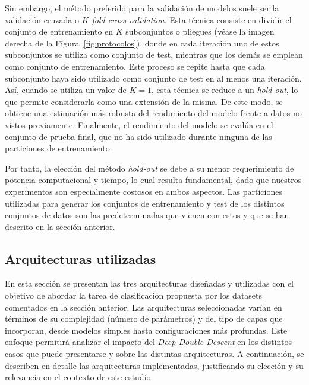 Sin embargo, el método preferido para la validación de modelos suele ser la validación cruzada o \textit{$K$-fold cross validation}. Esta técnica consiste en dividir el conjunto de entrenamiento en $K$ subconjuntos o pliegues (véase la imagen derecha de la Figura~\ref{fig:protocolos}), donde en cada iteración uno de estos subconjuntos se utiliza como conjunto de test, mientras que los demás se emplean como conjunto de entrenamiento. Este proceso se repite hasta que cada subconjunto haya sido utilizado como conjunto de test en al menos una iteración. Así, cuando se utiliza un valor de $K = 1$, esta técnica se reduce a un \textit{hold-out}, lo que permite considerarla como una extensión de la misma. De este modo, se obtiene una estimación más robusta del rendimiento del modelo frente a datos no vistos previamente. Finalmente, el rendimiento del modelo se evalúa en el conjunto de prueba final, que no ha sido utilizado durante ninguna de las particiones de entrenamiento.\newline

Por tanto, la elección del método \textit{hold-out} se debe a su menor requerimiento de potencia computacional y tiempo, lo cual resulta fundamental, dado que nuestros experimentos son especialmente costosos en ambos aspectos. Las particiones utilizadas para generar los conjuntos de entrenamiento y test de los distintos conjuntos de datos son las predeterminadas que vienen con estos y que se han descrito en la sección anterior.\newline

\subsection{Arquitecturas utilizadas}\label{subsec:arquitecturas}

En esta sección se presentan las tres arquitecturas diseñadas y utilizadas con el objetivo de abordar la tarea de clasificación propuesta por los datasets comentados en la sección anterior. Las arquitecturas seleccionadas varían en términos de su complejidad (número de parámetros) y del tipo de capas que incorporan, desde modelos simples hasta configuraciones más profundas. Este enfoque permitirá analizar el impacto del \textit{Deep Double Descent} en los distintos casos que puede presentarse y sobre las distintas arquitecturas. A continuación, se describen en detalle las arquitecturas implementadas, justificando su elección y su relevancia en el contexto de este estudio.\newline

